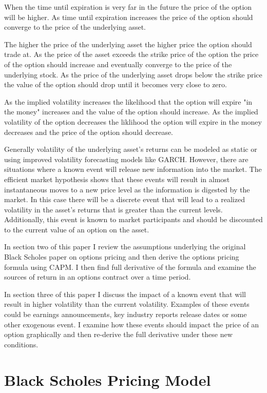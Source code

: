\documentclass{article}
\begin{document}
When the time until expiration is very far in the future the price of the option will be higher.  As time until expiration increases the price of the option should converge to the price of the underlying asset.

The higher the price of the underlying asset the higher price the option should trade at.  As the price of the asset exceeds the strike price of the option the price of the option should increase and eventually converge to the price of the underlying stock.  As the price of the underlying asset drops below the strike price the value of the option should drop until it becomes very close to zero.  

As the implied volatility increases the likelihood that the option will expire "in the money" increases and the value of the option should increase.  As the implied volatility of the option decreases the liklihood the option will expire in the money decreases and the price of the option should decrease.\cite{blackscholes73}

Generally volatility of the underlying asset's returns can be modeled as static or using improved volatility forecasting models like GARCH.  However, there are situations where a known event will release new information into the market.  The efficient market hypothesis shows that these events will result in almost instantaneous moves to a new price level as the information is digested by the market.  \cite{fama65}\cite{fama69}  In this case there will be a discrete event that will lead to a realized volatility in the asset's returns that is greater than the current levels.  Additionally, this event is known to market participants and should be discounted to the current value of an option on the asset.  
 
In section two of this paper I review the assumptions underlying the original Black Scholes paper on options pricing and then derive the options pricing formula using CAPM. I then find full derivative of the formula and examine the sources of return in an options contract over a time period.  

In section three of this paper I discuss the impact of a known event that will result in higher volatility than the current volatility.  Examples of these events could be earnings announcements, key industry reports release dates or some other exogenous event.  I examine how these events should impact the price of an option graphically and then re-derive the full derivative under these new conditions.  

\section{Black Scholes Pricing Model}
\end{document}
